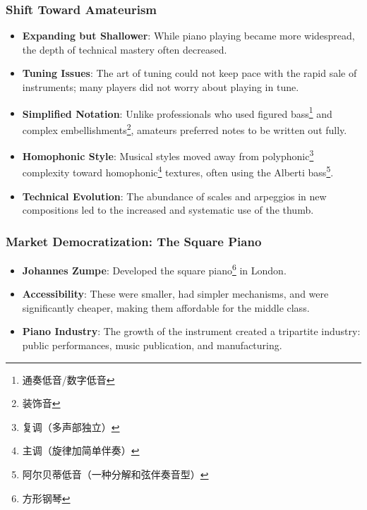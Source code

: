 \documentclass[math,code]{amznotes}
\theoremstyle{remark}
\begin{document}
\subsubsection{Shift Toward Amateurism}
\begin{itemize}
    \item \textbf{Expanding but Shallower}: While piano playing became more widespread, the depth of technical mastery often decreased.
    \item \textbf{Tuning Issues}: The art of tuning could not keep pace with the rapid sale of instruments; many players did not worry about playing in tune.
    \item \textbf{Simplified Notation}: Unlike professionals who used figured bass\footnote{通奏低音/数字低音} and complex embellishments\footnote{装饰音}, amateurs preferred notes to be written out fully.
    \item \textbf{Homophonic Style}: Musical styles moved away from polyphonic\footnote{复调（多声部独立）} complexity toward homophonic\footnote{主调（旋律加简单伴奏）} textures, often using the Alberti bass\footnote{阿尔贝蒂低音（一种分解和弦伴奏音型）}.
    \item \textbf{Technical Evolution}: The abundance of scales and arpeggios in new compositions led to the increased and systematic use of the thumb.
\end{itemize}

\subsubsection{Market Democratization: The Square Piano}
\begin{itemize}
    \item \textbf{Johannes Zumpe}: Developed the square piano\footnote{方形钢琴} in London.
    \item \textbf{Accessibility}: These were smaller, had simpler mechanisms, and were significantly cheaper, making them affordable for the middle class.
    \item \textbf{Piano Industry}: The growth of the instrument created a tripartite industry: public performances, music publication, and manufacturing.
\end{itemize}
\end{document}
